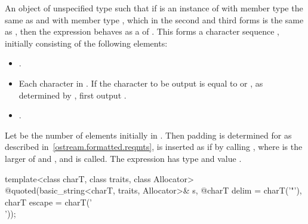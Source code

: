 \begin{itemdescr}
\pnum
\returns
An object of unspecified type such that if  is an instance
of  with member type  the same as
 and with member type , which in the second and third
forms is the same as , then the expression
behaves as a 
of . This forms a character sequence , initially
consisting of the following elements:
\begin{itemize}
\item {}.
\item Each character in . If the character to be output is equal to
 or , as determined by , first
output .
\item {}.
\end{itemize}
Let  be the number of elements initially in .
Then padding is determined for  as described
in~\ref{ostream.formatted.reqmts},  is inserted as if by calling
, where  is the larger of
 and , and  is called.
The expression  has type
 and value .
\end{itemdescr}

%
\begin{itemdecl}
template<class charT, class traits, class Allocator>
  @\unspec@ quoted(basic_string<charT, traits, Allocator>& s,
  @\itcorr@                   charT delim = charT('"'), charT escape = charT('\\'));
\end{itemdecl}

